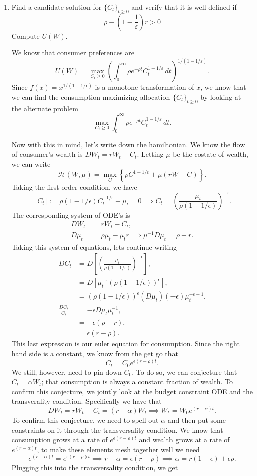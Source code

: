 \documentclass[11pt,english]{article}
\begin{document}
\begin{enumerate}[label = (\alph*)]
\item Find a candidate solution for $\{C_t\}_{t \geq 0}$ and verify that it is well defined if
\[
\rho - \left(1 - \frac{1}{\varepsilon}\right) r > 0
\]
Compute $U(W)$.
\begin{solution}
We know that consumer preferences are $$U(W) = \max_{C_t \geq 0} \left( \int_0^{\infty} \rho e^{-\rho t} C_t^{1-1/\varepsilon} \, dt \right)^{1/(1-1/\varepsilon)}.$$Since $f(x) = x^{1/(1 - 1/\epsilon)}$ is a monotone transformation of $x$, we know that we can find the consumption maximizing allocation $\{C_t\}_{t \geq 0}$ by looking at the alternate problem $$\max_{C_t \geq 0} \int_0^{\infty} \rho e^{-\rho t} C_t^{1-1/\varepsilon} \, dt.$$

Now with this in mind, let's write down the hamiltonian. We know the flow of consumer's wealth is $DW_t = rW_t - C_t$. Letting $\mu$ be the costate of wealth, we can write $$\mathcal{H}(W, \mu) = \max_{C}\left\{\rho C^{1 - 1/\epsilon} + \mu(rW - C)\right\}.$$ Taking the first order condition, we have $$[C_t]:\quad \rho (1 - 1/\epsilon) C_t^{-1/\epsilon} - \mu_t = 0 \implies C_t = \left(\frac{\mu_t}{\rho(1 - 1/\epsilon)}\right)^{-\epsilon}.$$The corresponding system of ODE's is 
\begin{align*}
DW_t &= rW_t - C_t,\\
D\mu_t &= \rho \mu_t - \mu_t r \implies \mu^{-1} D\mu_t = \rho - r.
\end{align*} Taking this system of equations, lets continue writing
\begin{align*}
DC_t &= D\left[\left(\frac{\mu_t}{\rho(1 - 1/\epsilon)}\right)^{-\epsilon}\right],\\
&= D\left[\mu_t^{-\epsilon}\left(\rho(1 - 1/\epsilon)\right)^{\epsilon}\right],\\
&= \left(\rho(1 - 1/\epsilon)\right)^{\epsilon} (D\mu_t)(-\epsilon) \mu_t^{-\epsilon - 1}.\\
\frac{DC_t}{C_t} &= -\epsilon D\mu_t \mu_t^{-1},\\
&= -\epsilon (\rho - r),\\
&= \epsilon (r - \rho).
\end{align*} This last expression is our euler equation for consumption. Since the right hand side is a constant, we know from the get go that $$C_t = C_0 e^{\epsilon(r - \rho)t}.$$ We still, however, need to pin down $C_0$. To do so, we can conjecture that $C_t = \alpha W_t$; that consumption is always a constant fraction of wealth. To confirm this conjecture, we jointly look at the budget constraint ODE and the transverality condition. Specifically we have that $$DW_t = rW_t - C_t = (r - \alpha) W_t \implies  W_t = W_0 e^{(r - \alpha)t}.$$ To confirm this conjecture, we need to spell out $\alpha$ and then put some constraints on it through the transversality condition. We know that consumption grows at a rate of $e^{\epsilon(r - \rho)t}$ and wealth grows at a rate of $e^{(r - \alpha)t}$, to make these elements mesh together well we need $$e^{(r - \alpha)t} = e^{\epsilon(r - \rho)t} \implies r - \alpha = \epsilon(r - \rho) \implies \alpha = r(1 - \epsilon) + \epsilon \rho.$$ Plugging this into the transversality condition, we get

\end{solution}
\end{enumerate}
\end{document}
